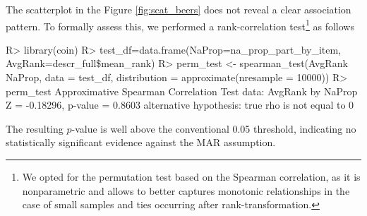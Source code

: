 %
The scatterplot in the Figure \ref{fig:scat_beers} does not reveal a clear association pattern. To formally assess this, we performed a rank-correlation test\footnote{We opted for the permutation test based on the Spearman correlation, as it is nonparametric and allows to better captures monotonic relationships in the case of small samples and ties occurring after rank-transformation.
} as follows
\begin{example*}
R> library(coin)
R> test\_df=data.frame(NaProp=na\_prop\_part\_by\_item, AvgRank=descr\_full\$mean\_rank)
R> perm\_test <- spearman\_test(AvgRank ~ NaProp, data = test\_df,
                             distribution = approximate(nresample = 10000))
R> perm\_test
	Approximative Spearman Correlation Test
data:  AvgRank by NaProp
Z = -0.18296, p-value = 0.8603
alternative hypothesis: true rho is not equal to 0
\end{example*}
The resulting $p$-value is well above the conventional 0.05 threshold, indicating no statistically significant evidence against
the MAR assumption.
